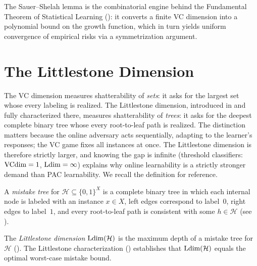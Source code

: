 The Sauer--Shelah lemma is the combinatorial engine behind the Fundamental
Theorem of Statistical Learning (): it converts
a finite VC dimension into a polynomial bound on the growth function, which in
turn yields uniform convergence of empirical risks via a symmetrization
argument.



\section{The Littlestone Dimension}
\label{sec:ldim-recall}

The VC dimension measures shatterability of \emph{sets}: it asks for the
largest set whose every labeling is realized.  The Littlestone dimension,
introduced in  and fully characterized there, measures
shatterability of \emph{trees}: it asks for the deepest complete binary tree
whose every root-to-leaf path is realized.  The distinction matters because
the online adversary acts sequentially, adapting to the learner's responses;
the VC game fixes all instances at once.  The Littlestone dimension is
therefore strictly larger, and knowing the gap is infinite (threshold
classifiers: $\mathrm{VCdim} = 1$, $\mathrm{Ldim} = \infty$) explains why online learnability
is a strictly stronger demand than PAC learnability.  We recall the definition for
reference.

\begin{defn}
\label{def:mistake-tree-recall}
A \emph{mistake tree} for $\mathcal{H} \subseteq \{0,1\}^X$ is a complete
binary tree in which each internal node is labeled with an instance $x \in X$,
left edges correspond to label~$0$, right edges to label~$1$, and every
root-to-leaf path is consistent with some $h \in \mathcal{H}$
(see ).
\end{defn}

\begin{defn}
\label{def:ldim-recall}
The \emph{Littlestone dimension} $\mathrm{Ldim}(\mathcal{H})$ is the maximum depth
of a mistake tree for $\mathcal{H}$ ().  The
Littlestone characterization () establishes that
$\mathrm{Ldim}(\mathcal{H})$ equals the optimal worst-case mistake bound.
\end{defn}

